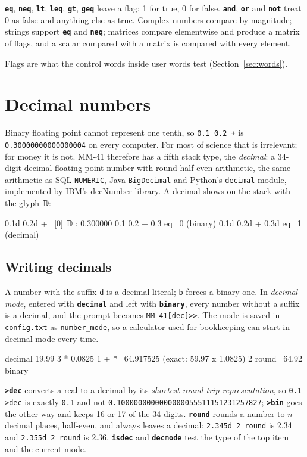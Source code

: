 \documentclass[11pt,letterpaper]{article}
\newcommand{\code}[1]{\texttt{#1}}
\newcommand{\g}[1]{{\mathglyphs #1}}   %
\newcommand{\cmd}[1]{\texttt{\textbf{#1}}}
\begin{document}
\cmd{eq}, \cmd{neq}, \cmd{lt}, \cmd{leq}, \cmd{gt}, \cmd{geq} leave a flag: 1 for true, 0 for false. \cmd{and}, \cmd{or} and \cmd{not} treat 0 as false and anything else as true. Complex numbers compare by magnitude; strings support \cmd{eq} and \cmd{neq}; matrices compare elementwise and produce a matrix of flags, and a scalar compared with a matrix is compared with every element.
Flags are what the control words inside user words test (Section~\ref{sec:words}).

\section{Decimal numbers}
\label{sec:decimal}

Binary floating point cannot represent one tenth, so \code{0.1 0.2 +} is \code{0.30000000000000004} on every computer. For most of science that is irrelevant; for money it is not. MM-41 therefore has a fifth stack type, the \emph{decimal}: a 34-digit decimal floating-point number with round-half-even arithmetic, the same arithmetic as SQL \code{NUMERIC}, Java \code{BigDecimal} and Python's \code{decimal} module, implemented by IBM's decNumber library. A decimal shows on the stack with the glyph \g{𝔻}:
\begin{rpn}
0.1d 0.2d +            \ [0] 𝔻 : 0.300000
0.1 0.2 + 0.3 eq       \ 0   (binary)
0.1d 0.2d + 0.3d eq    \ 1   (decimal)
\end{rpn}

\subsection{Writing decimals}

A number with the suffix \code{d} is a decimal literal; \code{b} forces a binary one. In \emph{decimal mode}, entered with \cmd{decimal} and left with \cmd{binary}, every number without a suffix is a decimal, and the prompt becomes \code{MM-41[dec]>>}. The mode is saved in \code{config.txt} as \code{number\_mode}, so a calculator used for bookkeeping can start in decimal mode every time.
\begin{rpn}
decimal
19.99 3 * 0.0825 1 + *         \ 64.917525   (exact: 59.97 x 1.0825)
2 round                        \ 64.92
binary
\end{rpn}
\cmd{>dec} converts a real to a decimal by its \emph{shortest round-trip representation}, so \code{0.1 >dec} is exactly \code{0.1} and not \code{0.1000000000000000055511151231257827}; \cmd{>bin} goes the other way and keeps 16 or 17 of the 34 digits. \cmd{round} rounds a number to $n$ decimal places, half-even, and always leaves a decimal: \code{2.345d 2 round} is 2.34 and \code{2.355d 2 round} is 2.36. \cmd{isdec} and \cmd{decmode} test the type of the top item and the current mode.
\end{document}
